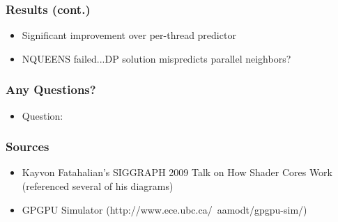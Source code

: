 \documentclass{beamer}
\begin{document}
\begin{frame}
 \frametitle{Results (cont.)}
\begin{itemize}
 \item Significant improvement over per-thread predictor
 \item NQUEENS failed...DP solution mispredicts parallel neighbors?
\end{itemize}

\end{frame}

\begin{frame}
 \frametitle{Any Questions?}
\begin{itemize}
 \item Question: 
\end{itemize}

\end{frame}


\begin{frame}
	\frametitle{Sources}
	\begin{itemize}
		\item Kayvon Fatahalian's SIGGRAPH 2009 Talk on How Shader Cores Work (referenced several of his diagrams)
		\item GPGPU Simulator (http://www.ece.ubc.ca/~aamodt/gpgpu-sim/)
	\end{itemize}
\end{frame}
\end{document}
